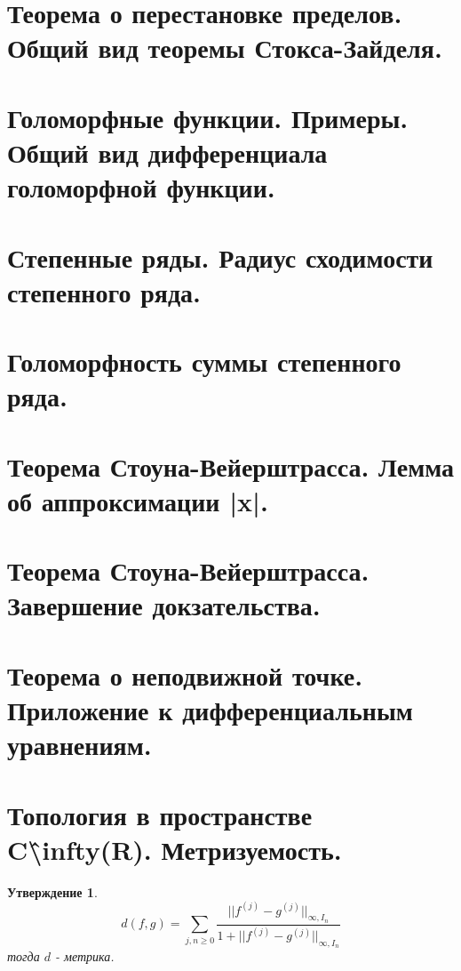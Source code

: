 \documentclass{article}
\theoremstyle{indented}
\newtheorem{stat}{Утверждение}
\theoremstyle{definition}
\theoremstyle{remark}
\begin{document}
\section{Теорема о перестановке пределов. Общий вид теоремы Стокса-Зайделя.}

\section{Голоморфные функции. Примеры. Общий вид дифференциала голоморфной функции.}

\section{Степенные ряды. Радиус сходимости степенного ряда.}

\section{Голоморфность суммы степенного ряда.}

\section{Теорема Стоуна-Вейерштрасса. Лемма об аппроксимации |x|.}

\section{Теорема Стоуна-Вейерштрасса. Завершение докзательства.}

\section{Теорема о неподвижной точке. Приложение к дифференциальным уравнениям.}

\section{Топология в пространстве C\^ \textbackslash infty(R). Метризуемость.}


\begin{stat}
    $$
    d(f,g) = \sum\limits_{j,n\geq 0} \frac{||f^{(j)}-g^{(j)}||_{\infty, I_n}}{1+||f^{(j)}-g^{(j)}||_{\infty, I_n}}
    $$
    тогда $d$ - метрика.
\end{stat}

\newpage
\hypertarget{t2}{}
\printindex
\end{document}
